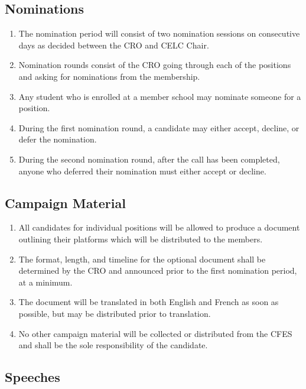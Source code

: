 \subsection{Nominations}
\label{nominations}

\begin{enumerate}
 \item
  The nomination period will consist of two nomination sessions on consecutive days as decided between the CRO and CELC Chair.
 \item
  Nomination rounds consist of the CRO going through each of the positions and asking for nominations from the membership.
 \item
  Any student who is enrolled at a member school may nominate someone for a position.
 \item
  During the first nomination round, a candidate may either accept, decline, or defer the nomination.
 \item
  During the second nomination round, after the call has been completed, anyone who deferred their nomination must either accept or decline.
\end{enumerate}

\subsection{Campaign Material}
\label{campaign-material}

\begin{enumerate}
 \item
  All candidates for individual positions will be allowed to produce a document outlining their platforms which will be distributed to the members.
 \item
  The format, length, and timeline for the optional document shall be determined by the CRO and announced prior to the first nomination period, at a minimum.
 \item
  The document will be translated in both English and French as soon as possible, but may be distributed prior to translation.
 \item
  No other campaign material will be collected or distributed from the CFES and shall be the sole responsibility of the candidate.
\end{enumerate}

\subsection{Speeches}
\label{speeches}

